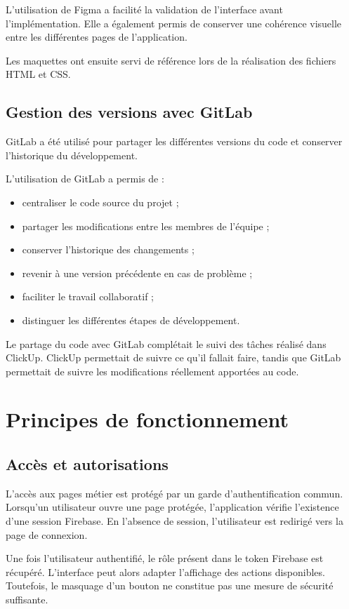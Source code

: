 \documentclass{rapportENSIAS}
\begin{document}
L’utilisation de Figma a facilité la validation de l’interface avant l’implémentation. Elle a également permis de conserver une cohérence visuelle entre les différentes pages de l’application.

Les maquettes ont ensuite servi de référence lors de la réalisation des fichiers HTML et CSS.

\subsection{Gestion des versions avec GitLab}

GitLab a été utilisé pour partager les différentes versions du code et conserver l’historique du développement.

L’utilisation de GitLab a permis de :

\begin{itemize}
\item centraliser le code source du projet ;
\item partager les modifications entre les membres de l’équipe ;
\item conserver l’historique des changements ;
\item revenir à une version précédente en cas de problème ;
\item faciliter le travail collaboratif ;
\item distinguer les différentes étapes de développement.
\end{itemize}

Le partage du code avec GitLab complétait le suivi des tâches réalisé dans ClickUp. ClickUp permettait de suivre ce qu’il fallait faire, tandis que GitLab permettait de suivre les modifications réellement apportées au code.

\section{Principes de fonctionnement}

\subsection{Accès et autorisations}

L’accès aux pages métier est protégé par un garde d’authentification commun. Lorsqu’un utilisateur ouvre une page protégée, l’application vérifie l’existence d’une session Firebase. En l’absence de session, l’utilisateur est redirigé vers la page de connexion.

Une fois l’utilisateur authentifié, le rôle présent dans le token Firebase est récupéré. L’interface peut alors adapter l’affichage des actions disponibles. Toutefois, le masquage d’un bouton ne constitue pas une mesure de sécurité suffisante.
\end{document}
